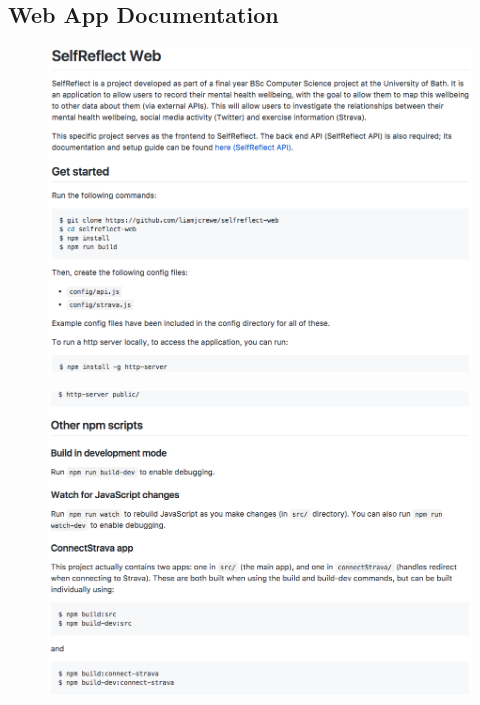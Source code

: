 \documentclass[11pt,openright,a4paper]{report}
\begin{document}
\begin{appendices}
\section{Web App Documentation} \label{app:webdocs}
\begin{figure}[ht]
  \centering
  \includegraphics[width=.9\textwidth]{i/webdocs1.png}
\end{figure}

\newpage
\begin{figure}[ht]
  \centering
  \includegraphics[width=.9\textwidth]{i/webdocs2.png}
\end{figure}


\end{appendices}
\end{document}
